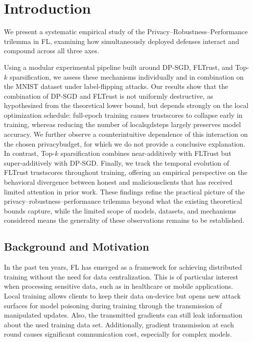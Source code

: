 \documentclass[11pt,twocolumn,a4paper,DIV=calc,parskip=half]{scrartcl}
\begin{document}
	\printnoidxglossary
	
	\section{Introduction}
	
	We present a systematic empirical study of the Privacy--Robustness--Performance
	trilemma in \ac{FL}, examining how simultaneously deployed defenses
	interact and compound across all three axes.
	
	Using a modular experimental pipeline built around \ac{DP-SGD}, FLTrust, and Top-$k$ sparsification, we assess these mechanisms individually and in combination on the MNIST dataset under label-flipping attacks. Our results show that the combination of \ac{DP-SGD} and FLTrust is not uniformly destructive, as hypothesized from the theoretical lower bound, but depends strongly on the local optimization schedule: full-epoch training causes \glspl{trustscore} to collapse early in training, whereas reducing the number of \glspl{localsgdstep} largely preserves model accuracy. We further observe a counterintuitive dependence of this interaction on the chosen \gls{privacybudget}, for which we do not provide a conclusive explanation. In contrast, Top-$k$ sparsification combines near-additively with FLTrust but super-additively with \ac{DP-SGD}. Finally, we track the temporal evolution of FLTrust \glspl{trustscore} throughout training, offering an empirical perspective on the behavioral divergence between honest and \glspl{maliciousclient} that has received limited attention in prior work. These findings refine the practical picture of the privacy--robustness--performance trilemma beyond what the existing theoretical bounds capture, while the limited scope of models, datasets, and mechanisms considered means the generality of these observations remains to be established.
	
	\subsection{Background and Motivation}
	
	In the past ten years, \ac{FL} has emerged as a framework for achieving distributed training without the need for data centralization. This is of particular interest when processing sensitive data, such as in healthcare or mobile applications. Local training allows clients to keep their data on-device but opens new attack surfaces for model poisoning during training through the transmission of manipulated updates. Also, the transmitted gradients can still leak information about the used training data set. Additionally, gradient transmission at each round causes significant communication cost, especially for complex models.
	
\end{document}
